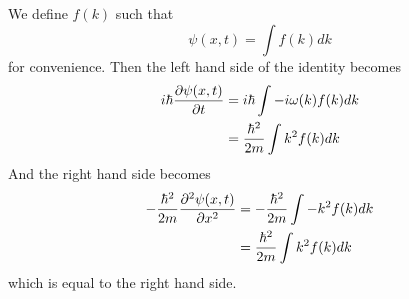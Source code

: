 \documentclass[answers]{exam}
\begin{document}
\begin{questions}
\begin{solution}
    We define $f(k)$ such that
    $$\psi(x,t) = \int f(k)dk$$
    for convenience. Then the left hand side of the identity becomes
    \begin{align*}
        i\hbar \frac{\partial \psi(x,t)}{\partial t} &= i\hbar \int -i\omega(k)f(k)dk \\
                                  &= \frac{\hbar^2}{2m} \int k^2f(k)dk
    \end{align*}
    And the right hand side becomes
    \begin{align*}
        -\frac{\hbar^2}{2m}\frac{\partial ^2\psi(x,t)}{\partial x^2} &= -\frac{\hbar^2}{2m} \int -k^2f(k)dk \\
                                                  &= \frac{\hbar^2}{2m} \int k^2f(k)dk
    \end{align*}
    which is equal to the right hand side.
\end{solution}



\end{questions}
\end{document}
